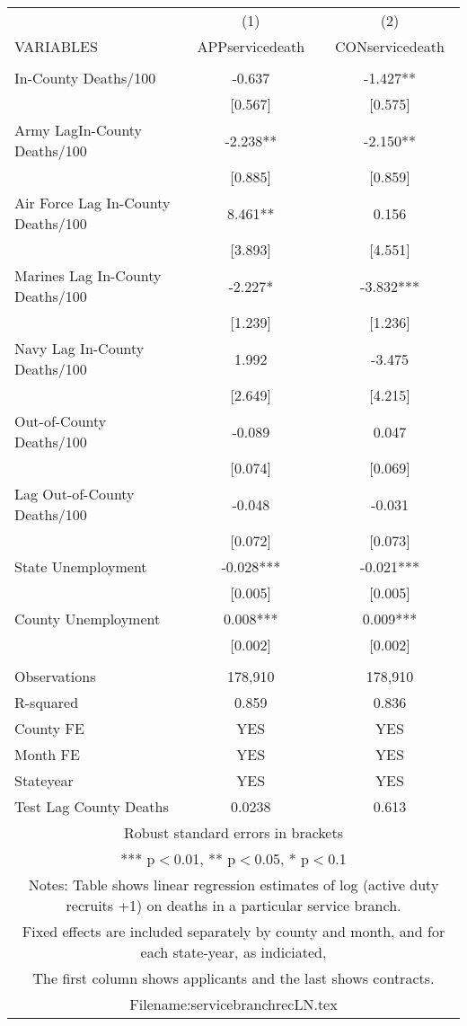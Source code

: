 \documentclass[]{article}
\begin{document}
\begin{tabular}{lcc} \hline
 & (1) & (2) \\
VARIABLES & APPservicedeath & CONservicedeath \\ \hline
 &  &  \\
In-County Deaths/100 & -0.637 & -1.427** \\
 & [0.567] & [0.575] \\
Army LagIn-County Deaths/100 & -2.238** & -2.150** \\
 & [0.885] & [0.859] \\
Air Force Lag In-County Deaths/100 & 8.461** & 0.156 \\
 & [3.893] & [4.551] \\
Marines Lag In-County Deaths/100 & -2.227* & -3.832*** \\
 & [1.239] & [1.236] \\
Navy Lag In-County Deaths/100 & 1.992 & -3.475 \\
 & [2.649] & [4.215] \\
Out-of-County Deaths/100 & -0.089 & 0.047 \\
 & [0.074] & [0.069] \\
Lag Out-of-County Deaths/100 & -0.048 & -0.031 \\
 & [0.072] & [0.073] \\
State Unemployment & -0.028*** & -0.021*** \\
 & [0.005] & [0.005] \\
County Unemployment & 0.008*** & 0.009*** \\
 & [0.002] & [0.002] \\
 &  &  \\
Observations & 178,910 & 178,910 \\
R-squared & 0.859 & 0.836 \\
County FE & YES & YES \\
Month FE & YES & YES \\
Stateyear & YES & YES \\
 Test Lag County Deaths & 0.0238 & 0.613 \\ \hline
\multicolumn{3}{c}{ Robust standard errors in brackets} \\
\multicolumn{3}{c}{ *** p$<$0.01, ** p$<$0.05, * p$<$0.1} \\
\multicolumn{3}{c}{ Notes: Table shows linear regression estimates of log (active duty recruits +1) on deaths in a particular service branch.} \\
\multicolumn{3}{c}{ Fixed effects are included separately by county and month, and for each state-year, as indiciated,} \\
\multicolumn{3}{c}{ The first column shows applicants and the last shows contracts.} \\
\multicolumn{3}{c}{ Filename:servicebranchrecLN.tex} \\
\end{tabular}
\end{document}
